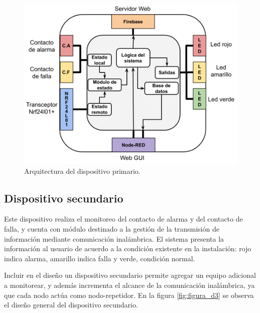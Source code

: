 \begin{figure}[h]
	\centering
	\includegraphics[scale=.4]{./Figures/Capitulo3/Fig_C3.png}
	\caption{Arquitectura del dispositivo primario.}
	\label{fig:figura_c3}
\end{figure}

\subsection{Dispositivo secundario}

Este dispositivo realiza el  monitoreo del contacto de alarma y del contacto de falla, y cuenta con módulo destinado a la gestión de la transmisión de información mediante comunicación inalámbrica. El sistema presenta la información al usuario de acuerdo a la condición existente en la instalación: rojo indica alarma, amarillo indica falla y verde, condición normal.


Incluir en el diseño un dispositivo secundario permite agregar un equipo adicional a monitorear, y además incrementa el alcance de la comunicación inalámbrica, ya que cada nodo actúa como nodo-repetidor. En la figura \ref{fig:figura_d3} se observa el diseño general del dispositivo secundario.


